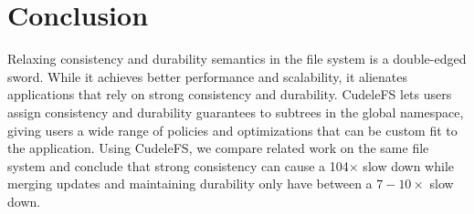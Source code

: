 %
%
%
%
%
%
%

\section{Conclusion}

Relaxing consistency and durability semantics in the file system is a
double-edged sword. While it achieves better performance and scalability, it
alienates applications that rely on strong consistency and durability. CudeleFS
lets users assign consistency and durability guarantees to subtrees in
the global namespace, giving users a wide range of policies and
optimizations that can be custom fit to the application. Using CudeleFS, we
compare related work on the same file system and conclude that strong
consistency can cause a 104\(\times\) slow down while merging updates and
maintaining durability only have between a \(7-10\times\) slow down.




